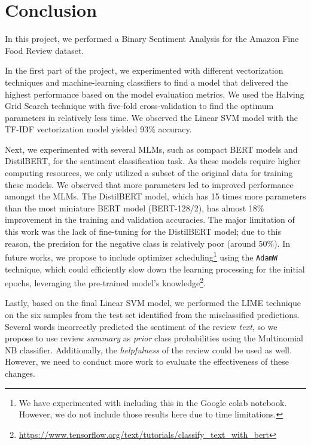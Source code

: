 \documentclass[11pt]{article}
\begin{document}
 
 \section{Conclusion}
In this project, we performed a Binary Sentiment Analysis for the Amazon Fine Food Review dataset. 
 
In the first part of the project, we experimented with different vectorization techniques and machine-learning classifiers to find a model that delivered the highest performance based on the model evaluation metrics. We used the Halving Grid Search technique with five-fold cross-validation to find the optimum parameters in relatively less time. We observed the Linear SVM model with the TF-IDF vectorization model yielded 93\% accuracy. 

Next, we experimented with several MLMs, such as compact BERT models and DistilBERT, for the sentiment classification task. As these models require higher computing resources, we only utilized a subset of the original data for training these models. We observed that more parameters led to improved performance amongst the MLMs. The DistilBERT model, which has 15 times more parameters than the most miniature BERT model (BERT-128/2), has almost 18\% improvement in the training and validation accuracies. The major limitation of this work was the lack of fine-tuning for the DistilBERT model; due to this reason, the precision for the negative class is relatively poor (around 50\%). In future works, we propose to include optimizer scheduling\footnote{We have experimented with including this in the Google colab notebook. However, we do not include those results here due to time limitations.} using the 
 \texttt{AdamW} \cite{adamw} technique, which could efficiently slow down the learning processing for the initial epochs, leveraging the pre-trained model's knowledge\footnote{\url{https://www.tensorflow.org/text/tutorials/classify_text_with_bert}}. 

Lastly, based on the final Linear SVM model, we performed the LIME technique on the six samples from the test set identified from the misclassified predictions. Several words incorrectly predicted the sentiment of the review \textit{text}, so we propose to use review \textit{summary} as \textit{prior} class probabilities using the Multinomial NB classifier. Additionally, the \textit{helpfulness} of the review could be used as well. However, we need to conduct more work to evaluate the effectiveness of these changes.






\appendix
\end{document}
